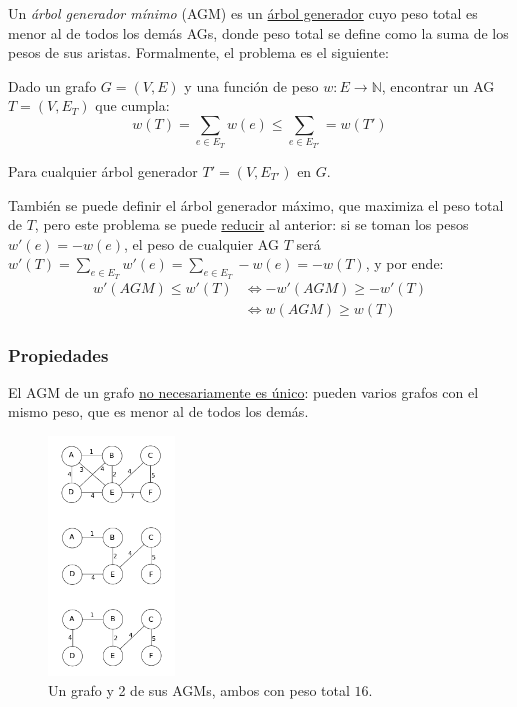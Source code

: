 \documentclass[a4paper]{report}
\newcommand{\N}{\mathbb{N}}
\begin{document}
Un \textit{árbol generador mínimo} (AGM) es un \hyperref[arbol-generador]{árbol generador} cuyo peso total es menor al de todos los demás AGs, donde peso total se define como la suma de los pesos de sus aristas. Formalmente, el problema es el siguiente:

\begin{problema}
    Dado un grafo $G = (V, E)$ y una función de peso $w: E \longrightarrow \N$, encontrar un AG $T = (V, E_T)$ que cumpla:
    $$w(T) = \sum_{e \in E_T} w(e) \leq \sum_{e \in E_{T'}} = w(T')$$

    Para cualquier árbol generador $T' = (V, E_{T'})$ en $G$.
\end{problema}

También se puede definir el árbol generador máximo, que maximiza el peso total de $T$, pero este problema se puede \hyperref[reducciones]{reducir} al anterior: si se toman los pesos $w'(e) = -w(e)$, el peso  de cualquier AG $T$ será $w'(T) = \sum_{e \in E_T} w'(e) = \sum_{e \in E_T} -w(e) = -w(T)$, y por ende:
\begin{align*}
    w'(AGM) \leq w'(T) & \iff -w'(AGM) \geq -w'(T) \\
                       & \iff w(AGM) \geq w(T)
\end{align*}

\subsubsection{Propiedades}

El AGM de un grafo \underline{no necesariamente es único}: pueden varios grafos con el mismo peso, que es menor al de todos los demás.

\begin{figure}[H]
    \centering
    \includegraphics[width=0.3\textwidth]{ejemplo_agm.png}
    \caption*{Un grafo y 2 de sus AGMs, ambos con peso total $16$.}
\end{figure}
\end{document}
